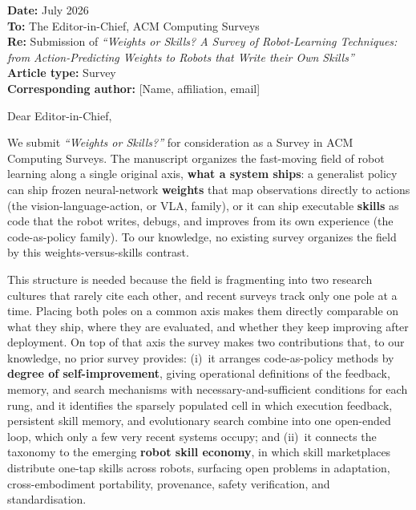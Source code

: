\documentclass[11pt]{article}
\begin{document}
\noindent\textbf{Date:} July 2026\\
\textbf{To:} The Editor-in-Chief, ACM Computing Surveys\\
\textbf{Re:} Submission of \emph{``Weights or Skills? A Survey of Robot-Learning Techniques:
from Action-Predicting Weights to Robots that Write their Own Skills''}\\
\textbf{Article type:} Survey\\
\textbf{Corresponding author:} [Name, affiliation, email]

\smallskip
\noindent Dear Editor-in-Chief,

We submit \emph{``Weights or Skills?''} for consideration as a Survey in ACM Computing Surveys.
The manuscript organizes the fast-moving field of robot learning along a single original axis,
\textbf{what a system ships}: a generalist policy can ship frozen neural-network \textbf{weights}
that map observations directly to actions (the vision-language-action, or VLA, family), or it can
ship executable \textbf{skills} as code that the robot writes, debugs, and improves from its own
experience (the code-as-policy family). To our knowledge, no existing survey organizes the field
by this weights-versus-skills contrast.

This structure is needed because the field is fragmenting into two research cultures that rarely
cite each other, and recent surveys track only one pole at a time. Placing both poles on a common
axis makes them directly comparable on what they ship, where they are evaluated, and whether they
keep improving after deployment. On top of that axis the survey makes two contributions that, to
our knowledge, no prior survey provides: (i)~it arranges code-as-policy methods by \textbf{degree
of self-improvement}, giving operational definitions of the feedback, memory, and search
mechanisms with necessary-and-sufficient conditions for each rung, and it identifies the sparsely
populated cell in which execution feedback, persistent skill memory, and evolutionary search
combine into one open-ended loop, which only a few very recent systems occupy; and (ii)~it
connects the taxonomy to the emerging \textbf{robot skill economy}, in which skill marketplaces
distribute one-tap skills across robots, surfacing open problems in adaptation, cross-embodiment
portability, provenance, safety verification, and standardisation.
\end{document}
